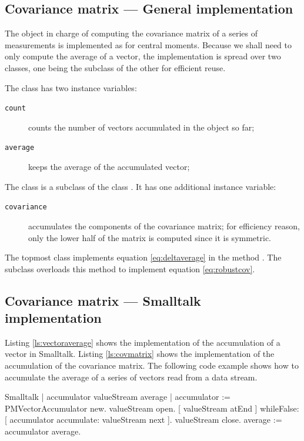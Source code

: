 \subsection{Covariance matrix --- General implementation}
 The
object in charge of computing the covariance matrix of a series of
measurements is implemented as for central moments. Because we
shall need to only compute the average of a vector, the
implementation is spread over two classes, one being the subclass
of the other for efficient reuse.

\noindent The class  has two instance
variables: {} {\parskip 0pt
\begin{description}
  \item[\texttt{count}] counts the number of vectors accumulated in the object so far;
  \item[\texttt{average}] keeps the average of the accumulated vector;
\end{description}
}

\noindent The class  is a subclass of
the class . It has one additional instance
variable: {} {\parskip 0pt
\begin{description}
  \item[\texttt{covariance}] accumulates the components of the covariance
  matrix; for efficiency reason, only the lower half of the matrix
  is computed since it is symmetric.
\end{description}
}

The topmost class implements equation \ref{eq:deltaverage} in the
method . The subclass overloads this method to
implement equation \ref{eq:robustcov}.

\subsection{Covariance matrix --- Smalltalk implementation}
\label{sec:scovmatrix} Listing \ref{ls:vectoraverage} shows the
implementation of the accumulation of a vector in Smalltalk.
Listing \ref{ls:covmatrix} shows the implementation of the
accumulation of the covariance matrix. The following code example
shows how to accumulate the average of a series of vectors read
from a data stream.

\begin{listing}{Smalltalk}
{ }
 | accumulator valueStream average |
 accumulator := PMVectorAccumulator new.
 valueStream open.
 [ valueStream atEnd ]
        whileFalse: [ accumulator accumulate: valueStream next ].
 valueStream close.
 average := accumulator average.
\end{listing}

